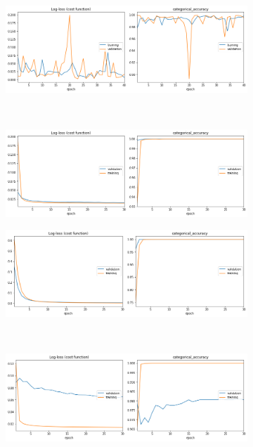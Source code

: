 \begin{figure}[p]
    \centering
    \begin{subfigure}[b]{0.485\textwidth}
        \includegraphics[width=\textwidth]{include/graphics/experimental_plots/color/gncnn_hic}
    \end{subfigure}
    ~
    \begin{subfigure}[b]{0.485\textwidth}
        \includegraphics[width=\textwidth]{include/graphics/experimental_plots/color/mixed_hic}
    \end{subfigure}
\bigskip
    \begin{subfigure}[b]{0.485\textwidth}
        \includegraphics[width=\textwidth]{include/graphics/experimental_plots/color/french_koch}
    \end{subfigure}
    ~
    \begin{subfigure}[b]{0.485\textwidth}
        \includegraphics[width=\textwidth]{include/graphics/experimental_plots/color/mixed_koch}
    \end{subfigure}
    

\end{figure}
